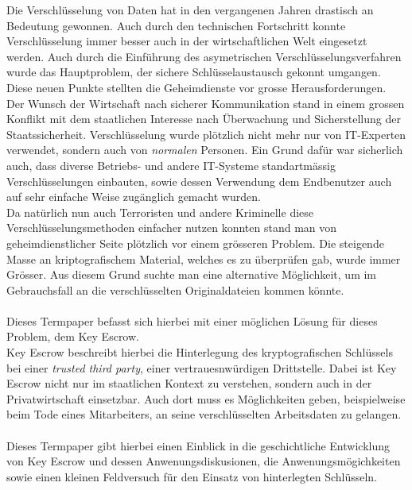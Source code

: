 Die Verschlüsselung von Daten hat in den vergangenen Jahren drastisch an Bedeutung gewonnen. Auch durch den technischen Fortschritt konnte Verschlüsselung immer besser auch in der wirtschaftlichen Welt eingesetzt werden. Auch durch die Einführung des asymetrischen Verschlüsselungsverfahren wurde das Hauptproblem, der sichere Schlüsselaustausch gekonnt umgangen. \\
Diese neuen Punkte stellten die Geheimdienste vor grosse Herausforderungen. Der Wunsch der Wirtschaft nach sicherer Kommunikation stand in einem grossen Konflikt mit dem staatlichen Interesse nach Überwachung und Sicherstellung der Staatssicherheit. Verschlüsselung wurde plötzlich nicht mehr nur von IT-Experten verwendet, sondern auch von \textit{normalen} Personen. Ein Grund dafür war sicherlich auch, dass diverse Betriebs- und andere IT-Systeme standartmässig Verschlüsselungen einbauten, sowie dessen Verwendung dem Endbenutzer auch auf sehr einfache Weise zugänglich gemacht wurden. \\
Da natürlich nun auch Terroristen und andere Kriminelle diese Verschlüsselungsmethoden einfacher nutzen konnten stand man von geheimdienstlicher Seite plötzlich vor einem grösseren Problem. Die steigende Masse an kriptografischem Material, welches es zu überprüfen gab, wurde immer Grösser. Aus diesem Grund suchte man eine alternative Möglichkeit, um im Gebrauchsfall an die verschlüsselten Originaldateien kommen könnte. \\
\\
Dieses Termpaper befasst sich hierbei mit einer möglichen Lösung für dieses Problem, dem Key Escrow.\\
Key Escrow beschreibt hierbei die Hinterlegung des kryptografischen Schlüssels bei einer \textit{trusted third party}, einer vertrauesnwürdigen Drittstelle. Dabei ist Key Escrow nicht nur im staatlichen Kontext zu verstehen, sondern auch in der Privatwirtschaft einsetzbar. Auch dort muss es Möglichkeiten geben, beispielweise beim Tode eines Mitarbeiters, an seine verschlüsselten Arbeitsdaten zu gelangen. \\
\\
Dieses Termpaper gibt hierbei einen Einblick in die geschichtliche Entwicklung von Key Escrow und dessen Anwenungsdiskusionen, die Anwenungsmögichkeiten sowie einen kleinen Feldversuch für den Einsatz von hinterlegten Schlüsseln.


